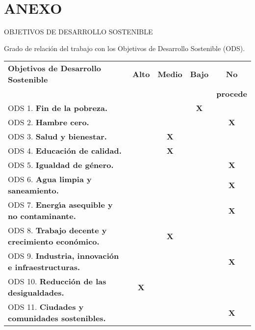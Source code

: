 \documentclass[11pt]{article}
\begin{document}
\phantom{x}

\vspace{1ex}

\section*{ANEXO}

\vspace{2ex}

OBJETIVOS DE DESARROLLO SOSTENIBLE

\vspace{4ex}

Grado de relaci\'on del trabajo con los Objetivos de Desarrollo Sostenible (ODS).

\vspace{2ex}

\begin{tabular}{|l|c|c|c|c|}\hline
\textbf{Objetivos de Desarrollo Sostenible} & \textbf{Alto} & \textbf{Medio} & \textbf{Bajo} & \textbf{No} \\
& & & & \textbf{procede} \\ \hline
ODS 1.  \textbf{Fin de la pobreza.}                            & & & \textbf{X} &  \\ \hline
ODS 2.  \textbf{Hambre cero.}                                  & & & & \textbf{X} \\ \hline
ODS 3.  \textbf{Salud y bienestar.}                            & & \textbf{X} &  & \\ \hline
ODS 4.  \textbf{Educaci\'on de calidad.}                       & & \textbf{X} & & \\ \hline
ODS 5.  \textbf{Igualdad de g\'enero.}                         & & & & \textbf{X} \\ \hline
ODS 6.  \textbf{Agua limpia y saneamiento.}                    & & & & \textbf{X} \\ \hline
ODS 7.  \textbf{Energ\'{\i}a asequible y no contaminante.}     & & & & \textbf{X} \\ \hline
ODS 8.  \textbf{Trabajo decente y crecimiento econ\'omico.}    & & \textbf{X} & & \\ \hline
ODS 9.  \textbf{Industria, innovaci\'on e infraestructuras.}   & & & & \textbf{X} \\ \hline
ODS 10. \textbf{Reducci\'on de las desigualdades.}             & \textbf{X} & & & \\ \hline
ODS 11. \textbf{Ciudades y comunidades sostenibles.}           & & & & \textbf{X} \\ \hline

\end{tabular}
\end{document}
